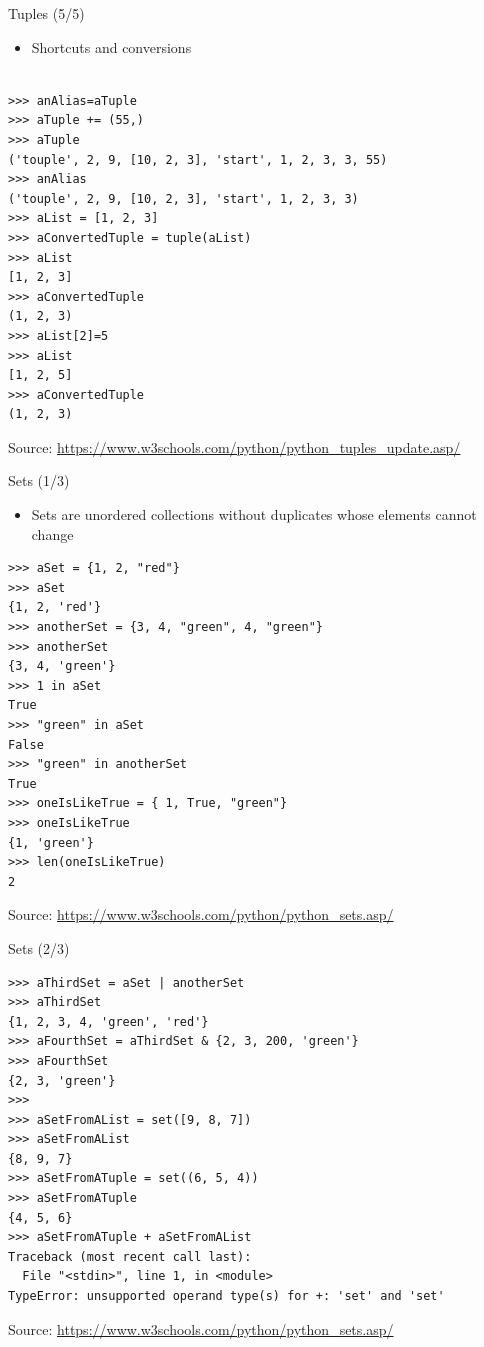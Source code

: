 \documentclass{beamer}
\begin{document}
\begin{frame}[fragile]
{\centerline{Tuples (5/5)}}
\begin{itemize}
    \item Shortcuts and conversions
\end{itemize}
\begin{lstlisting}[style=myPythonStyle]

>>> anAlias=aTuple
>>> aTuple += (55,)
>>> aTuple
('touple', 2, 9, [10, 2, 3], 'start', 1, 2, 3, 3, 55)
>>> anAlias
('touple', 2, 9, [10, 2, 3], 'start', 1, 2, 3, 3)
>>> aList = [1, 2, 3]
>>> aConvertedTuple = tuple(aList)
>>> aList
[1, 2, 3]
>>> aConvertedTuple
(1, 2, 3)
>>> aList[2]=5
>>> aList
[1, 2, 5]
>>> aConvertedTuple
(1, 2, 3)
\end{lstlisting}


\begin{center}
\tiny Source: \url{https://www.w3schools.com/python/python_tuples_update.asp/}
\end{center}
\end{frame}


\begin{frame}[fragile]
{\centerline{Sets (1/3)}}
\begin{itemize}
    \item Sets are unordered collections without duplicates whose elements cannot change
\end{itemize}
\begin{lstlisting}[style=myPythonStyle]
>>> aSet = {1, 2, "red"}
>>> aSet
{1, 2, 'red'}
>>> anotherSet = {3, 4, "green", 4, "green"}
>>> anotherSet
{3, 4, 'green'}
>>> 1 in aSet
True
>>> "green" in aSet
False
>>> "green" in anotherSet
True
>>> oneIsLikeTrue = { 1, True, "green"}
>>> oneIsLikeTrue
{1, 'green'}
>>> len(oneIsLikeTrue)
2
\end{lstlisting}


\begin{center}
\tiny Source: \url{https://www.w3schools.com/python/python_sets.asp/}
\end{center}


\end{frame}

\begin{frame}[fragile]
{\centerline{Sets (2/3)}}
\begin{lstlisting}[style=myPythonStyle]
>>> aThirdSet = aSet | anotherSet
>>> aThirdSet
{1, 2, 3, 4, 'green', 'red'}
>>> aFourthSet = aThirdSet & {2, 3, 200, 'green'}
>>> aFourthSet
{2, 3, 'green'}
>>> 
>>> aSetFromAList = set([9, 8, 7])
>>> aSetFromAList
{8, 9, 7}
>>> aSetFromATuple = set((6, 5, 4))
>>> aSetFromATuple 
{4, 5, 6}
>>> aSetFromATuple + aSetFromAList
Traceback (most recent call last):
  File "<stdin>", line 1, in <module>
TypeError: unsupported operand type(s) for +: 'set' and 'set'

\end{lstlisting}


\begin{center}
\tiny Source: \url{https://www.w3schools.com/python/python_sets.asp/}
\end{center}


\end{frame}
\end{document}
